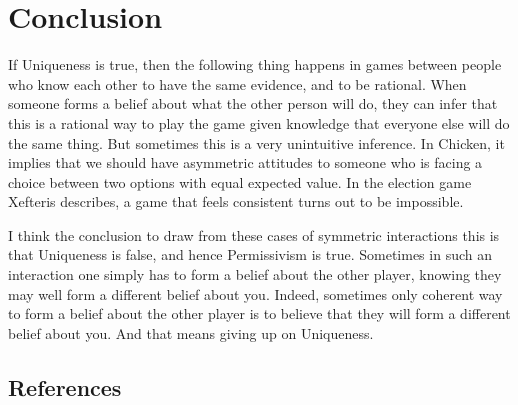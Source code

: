 \documentclass[
  10pt,
  letterpaper,
  DIV=11,
  numbers=noendperiod,
  twoside]{scrartcl}
\begin{document}
\section{Conclusion}\label{conclusion}

If Uniqueness is true, then the following thing happens in games between
people who know each other to have the same evidence, and to be
rational. When someone forms a belief about what the other person will
do, they can infer that this is a rational way to play the game given
knowledge that everyone else will do the same thing. But sometimes this
is a very unintuitive inference. In Chicken, it implies that we should
have asymmetric attitudes to someone who is facing a choice between two
options with equal expected value. In the election game Xefteris
describes, a game that feels consistent turns out to be impossible.

I think the conclusion to draw from these cases of symmetric
interactions this is that Uniqueness is false, and hence Permissivism is
true. Sometimes in such an interaction one simply has to form a belief
about the other player, knowing they may well form a different belief
about you. Indeed, sometimes only coherent way to form a belief about
the other player is to believe that they will form a different belief
about you. And that means giving up on Uniqueness.

\subsection*{References}\label{references}
\end{document}
